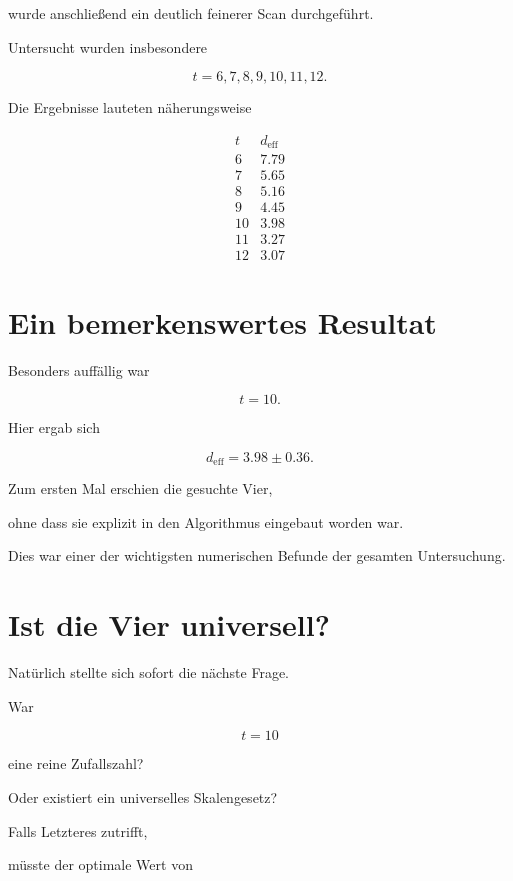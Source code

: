 wurde anschließend ein deutlich feinerer Scan durchgeführt.

Untersucht wurden insbesondere

\[
t
=
6,7,8,9,10,11,12.
\]

Die Ergebnisse lauteten näherungsweise

\[
\begin{array}{c|c}
t
&
d_{\mathrm{eff}}
\\
\hline
6
&
7.79
\\
7
&
5.65
\\
8
&
5.16
\\
9
&
4.45
\\
10
&
3.98
\\
11
&
3.27
\\
12
&
3.07
\end{array}
\]


\section*{Ein bemerkenswertes Resultat}

Besonders auffällig war

\[
t
=
10.
\]

Hier ergab sich

\[
d_{\mathrm{eff}}
=
3.98
\pm
0.36.
\]

Zum ersten Mal erschien die gesuchte Vier,

ohne dass sie explizit in den Algorithmus eingebaut worden war.

Dies war einer der wichtigsten numerischen Befunde der gesamten Untersuchung.


\section*{Ist die Vier universell?}

Natürlich stellte sich sofort die nächste Frage.

War

\[
t
=
10
\]

eine reine Zufallszahl?

Oder existiert ein universelles Skalengesetz?

Falls Letzteres zutrifft,

müsste der optimale Wert von

